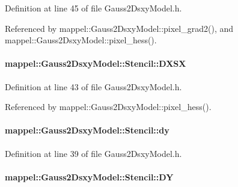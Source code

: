 Definition at line 45 of file Gauss2\+Dsxy\+Model.\+h.



Referenced by mappel\+::\+Gauss2\+Dsxy\+Model\+::pixel\+\_\+grad2(), and mappel\+::\+Gauss2\+Dsxy\+Model\+::pixel\+\_\+hess().

\paragraph[{\texorpdfstring{D\+X\+SX}{DXSX}}]{ mappel\+::\+Gauss2\+Dsxy\+Model\+::\+Stencil\+::\+D\+X\+SX}\hypertarget{classmappel_1_1Gauss2DsxyModel_1_1Stencil_a9d8ab3bc2b3bed0fa46fe95181cda425}{}\label{classmappel_1_1Gauss2DsxyModel_1_1Stencil_a9d8ab3bc2b3bed0fa46fe95181cda425}


Definition at line 43 of file Gauss2\+Dsxy\+Model.\+h.



Referenced by mappel\+::\+Gauss2\+Dsxy\+Model\+::pixel\+\_\+hess().

\paragraph[{\texorpdfstring{dy}{dy}}]{ mappel\+::\+Gauss2\+Dsxy\+Model\+::\+Stencil\+::dy}\hypertarget{classmappel_1_1Gauss2DsxyModel_1_1Stencil_aa89d3b5e37738ef91955a5578f4de477}{}\label{classmappel_1_1Gauss2DsxyModel_1_1Stencil_aa89d3b5e37738ef91955a5578f4de477}


Definition at line 39 of file Gauss2\+Dsxy\+Model.\+h.

\paragraph[{\texorpdfstring{DY}{DY}}]{ mappel\+::\+Gauss2\+Dsxy\+Model\+::\+Stencil\+::\+DY}\hypertarget{classmappel_1_1Gauss2DsxyModel_1_1Stencil_a5d030a8a7baccec952930dc6e951a0b6}{}\label{classmappel_1_1Gauss2DsxyModel_1_1Stencil_a5d030a8a7baccec952930dc6e951a0b6}


